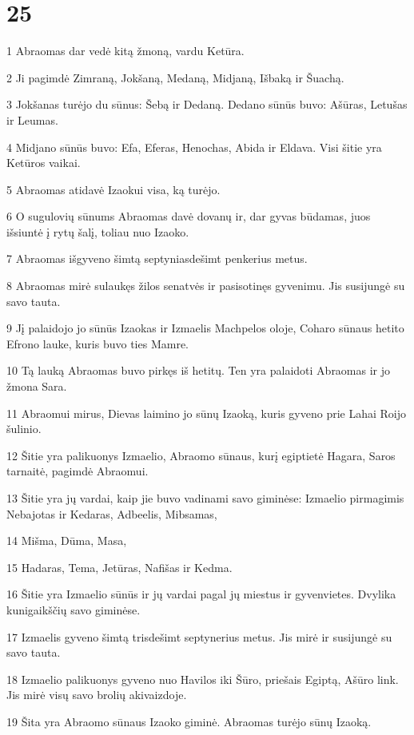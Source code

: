 \chapter{25}

\par 1 Abraomas dar vedė kitą žmoną, vardu Ketūra. 
\par 2 Ji pagimdė Zimraną, Jokšaną, Medaną, Midjaną, Išbaką ir Šuachą. 
\par 3 Jokšanas turėjo du sūnus: Šebą ir Dedaną. Dedano sūnūs buvo: Ašūras, Letušas ir Leumas. 
\par 4 Midjano sūnūs buvo: Efa, Eferas, Henochas, Abida ir Eldava. Visi šitie yra Ketūros vaikai. 
\par 5 Abraomas atidavė Izaokui visa, ką turėjo. 
\par 6 O sugulovių sūnums Abraomas davė dovanų ir, dar gyvas būdamas, juos išsiuntė į rytų šalį, toliau nuo Izaoko. 
\par 7 Abraomas išgyveno šimtą septyniasdešimt penkerius metus. 
\par 8 Abraomas mirė sulaukęs žilos senatvės ir pasisotinęs gyvenimu. Jis susijungė su savo tauta. 
\par 9 Jį palaidojo jo sūnūs Izaokas ir Izmaelis Machpelos oloje, Coharo sūnaus hetito Efrono lauke, kuris buvo ties Mamre. 
\par 10 Tą lauką Abraomas buvo pirkęs iš hetitų. Ten yra palaidoti Abraomas ir jo žmona Sara. 
\par 11 Abraomui mirus, Dievas laimino jo sūnų Izaoką, kuris gyveno prie Lahai Roijo šulinio. 
\par 12 Šitie yra palikuonys Izmaelio, Abraomo sūnaus, kurį egiptietė Hagara, Saros tarnaitė, pagimdė Abraomui. 
\par 13 Šitie yra jų vardai, kaip jie buvo vadinami savo giminėse: Izmaelio pirmagimis Nebajotas ir Kedaras, Adbeelis, Mibsamas, 
\par 14 Mišma, Dūma, Masa, 
\par 15 Hadaras, Tema, Jetūras, Nafišas ir Kedma. 
\par 16 Šitie yra Izmaelio sūnūs ir jų vardai pagal jų miestus ir gyvenvietes. Dvylika kunigaikščių savo giminėse. 
\par 17 Izmaelis gyveno šimtą trisdešimt septynerius metus. Jis mirė ir susijungė su savo tauta. 
\par 18 Izmaelio palikuonys gyveno nuo Havilos iki Šūro, priešais Egiptą, Ašūro link. Jis mirė visų savo brolių akivaizdoje. 
\par 19 Šita yra Abraomo sūnaus Izaoko giminė. Abraomas turėjo sūnų Izaoką. 
